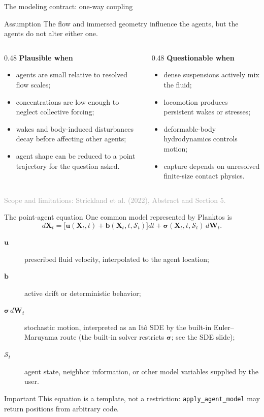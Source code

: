 \documentclass[aspectratio=169,11pt]{beamer}
\newcommand{\XX}{\bm{X}}
\newcommand{\uu}{\bm{u}}
\newcommand{\bb}{\bm{b}}
\newcommand{\sourcecredit}[1]{\vfill\hfill{\tiny\textcolor{DarkGray}{#1}}}
\newcommand{\code}[1]{\texttt{#1}}
\begin{document}
\begin{frame}{The modeling contract: one-way coupling}
\begin{block}{Assumption}
The flow and immersed geometry influence the agents, but the agents do not alter either one.
\end{block}
\begin{columns}[T,onlytextwidth]
  \begin{column}{0.48\textwidth}
    \textbf{Plausible when}
    \begin{itemize}
      \item agents are small relative to resolved flow scales;
      \item concentrations are low enough to neglect collective forcing;
      \item wakes and body-induced disturbances decay before affecting other agents;
      \item agent shape can be reduced to a point trajectory for the question asked.
    \end{itemize}
  \end{column}
  \begin{column}{0.48\textwidth}
    \textbf{Questionable when}
    \begin{itemize}
      \item dense suspensions actively mix the fluid;
      \item locomotion produces persistent wakes or stresses;
      \item deformable-body hydrodynamics controls motion;
      \item capture depends on unresolved finite-size contact physics.
    \end{itemize}
  \end{column}
\end{columns}
\sourcecredit{Scope and limitations: Strickland et al. (2022), Abstract and Section 5.}
\end{frame}

\begin{frame}{The point-agent equation}
One common model represented by Planktos is
\[
  d\XX_t=\big[\uu(\XX_t,t)+\bb(\XX_t,t,\mathcal S_t)\big]dt
  +\bm{\sigma}(\XX_t,t,\mathcal S_t)\,d\bm W_t.
\]
\begin{description}
  \item[$\uu$] prescribed fluid velocity, interpolated to the agent location;
  \item[$\bb$] active drift or deterministic behavior;
  \item[$\bm\sigma\,d\bm W_t$] stochastic motion, interpreted as an It\^o SDE by the built-in Euler--Maruyama route (the built-in solver restricts $\bm\sigma$; see the SDE slide);
  \item[$\mathcal S_t$] agent state, neighbor information, or other model variables supplied by the user.
\end{description}
\begin{alertblock}{Important}
This equation is a template, not a restriction: \code{apply\_agent\_model} may return positions from arbitrary code.
\end{alertblock}
\end{frame}
\end{document}
